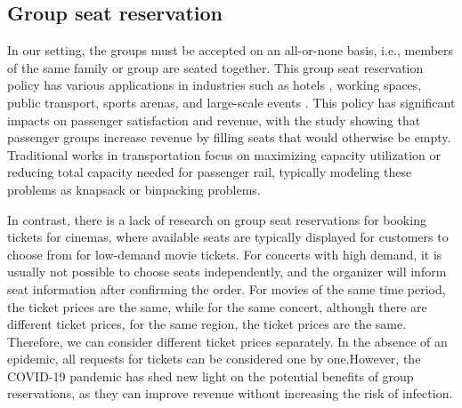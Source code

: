 


\subsection{Group seat reservation}
In our setting, the groups must be accepted on an all-or-none basis, i.e., members of the same family or group are seated together. 
This group seat reservation policy has various applications in industries such as hotels \cite{li2013modeling}, working spaces\cite{fischetti2021safe}, public transport\cite{deplano2019offline}, sports arenas\cite{kwag2022optimal}, and large-scale events \cite{lewis2016creating}. This policy has significant impacts on passenger satisfaction and revenue, with the study \cite{yuen2002group} showing that passenger groups increase revenue by filling seats that would otherwise be empty. Traditional works \cite{clausen2010off, deplano2019offline}in transportation focus on maximizing capacity utilization or reducing total capacity needed for passenger rail, typically modeling these problems as knapsack or binpacking problems.

In contrast, there is a lack of research on group seat reservations for booking tickets for cinemas, where available seats are typically displayed for customers to choose from for low-demand movie tickets. For concerts with high demand, it is usually not possible to choose seats independently, and the organizer will inform seat information after confirming the order. 
For movies of the same time period, the ticket prices are the same, while for the same concert, although there are different ticket prices, for the same region, the ticket prices are the same. Therefore, we can consider different ticket prices separately. 
In the absence of an epidemic, all requests for tickets can be considered one by one.However, the COVID-19 pandemic has shed new light on the potential benefits of group reservations, as they can improve revenue without increasing the risk of infection.

